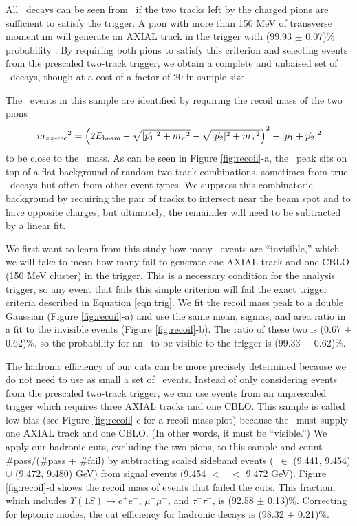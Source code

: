 \documentclass[aps,prd,preprint,superscriptaddress,tightenlines,nofootinbib,floatfix]{revtex4}
\begin{document}
All \uone\ decays can be seen from \twotoone\ if the two tracks left
by the charged pions are sufficient to satisfy the trigger.  A pion
with more than 150 MeV of transverse momentum will generate an AXIAL
track in the trigger with (99.93 $\pm$ 0.07)\% probability
\cite{inga}.  By requiring both pions to satisfy this criterion and
selecting events from the prescaled two-track trigger, we obtain a
complete and unbaised set of \uone\ decays, though at a cost of a
factor of 20 in sample size.

The \twotoone\ events in this sample are identified by requiring the
recoil mass of the two pions
\begin{equation}
  {m_{\mbox{\scriptsize $\pi\pi$-rec}}}^2 = \left(2 E_{\mbox{\scriptsize beam}} - \sqrt{|\vec{p}_1|^2 + {m_\pi}^2}
  - \sqrt{|\vec{p}_2|^2 + {m_\pi}^2}\right)^2 - |\vec{p}_1 + \vec{p}_2|^2
\end{equation}
to be close to the \uone\ mass.  As can be seen in Figure
\ref{fig:recoil}-a, the \uone\ peak sits on top of a flat background
of random two-track combinations, sometimes from true \twotoone\
decays but often from other event types.  We suppress this
combinatoric background by requiring the pair of tracks to intersect
near the beam spot and to have opposite charges, but ultimately, the
remainder will need to be subtracted by a linear fit.

We first want to learn from this study how many \uone\ events are
``invisible,'' which we will take to mean how many fail to generate
one AXIAL track and one CBLO (150 MeV cluster) in the trigger.  This
is a necessary condition for the analysis trigger, so any event that
fails this simple criterion will fail the exact trigger criteria
described in Equation \ref{eqn:trig}.  We fit the recoil mass peak to
a double Gaussian (Figure \ref{fig:recoil}-a) and use the same mean,
sigmas, and area ratio in a fit to the invisible events (Figure
\ref{fig:recoil}-b).  The ratio of these two is (0.67 $\pm$ 0.62)\%,
so the probability for an \uone\ to be visible to the trigger is
(99.33 $\pm$ 0.62)\%.

The hadronic efficiency of our cuts can be more precisely determined
because we do not need to use as small a set of \twotoone\ events.
Instead of only considering events from the prescaled two-track
trigger, we can use events from an unprescaled trigger which requires
three AXIAL tracks and one CBLO.  This sample is called low-bias (see
Figure \ref{fig:recoil}-c for a recoil mass plot) because the \uone\
must supply one AXIAL track and one CBLO.  (In other words, it must be
``visible.'')  We apply our hadronic cuts, excluding the two pions, to
this sample and count \#pass/(\#pass $+$ \#fail) by subtracting scaled
sideband events (\mpprec\ $\in$ (9.441, 9.454) $\cup$ (9.472, 9.480)
GeV) from signal events (9.454 $<$ \mpprec\ $<$ 9.472 GeV).  Figure
\ref{fig:recoil}-d shows the recoil mass of events that failed the
cuts.  This fraction, which includes $\Upsilon(1S) \to e^+e^-$,
$\mu^+\mu^-$, and $\tau^+\tau^-$, is (92.58 $\pm$ 0.13)\%.  Correcting
for leptonic modes, the cut efficiency for hadronic decays is (98.32
$\pm$ 0.21)\%.
\end{document}
